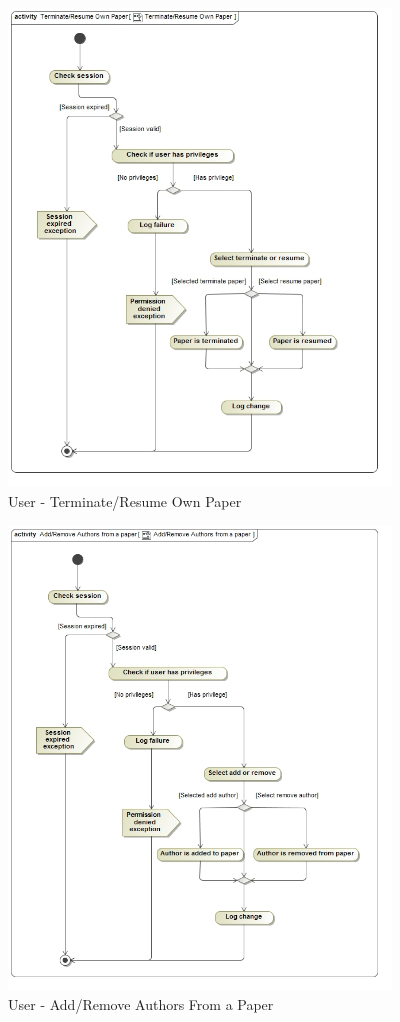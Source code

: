 \documentclass{article}
\begin{document}
			\begin{figure}[H]
					\includegraphics[width=4in, center]{../Diagrams/Process Specifications/Publication subsystem/Terminate_Resume Own Paper.jpg}
					\caption{User - Terminate/Resume Own Paper}
			\end{figure}
			\begin{figure}[H]
				\includegraphics[width=4in, center]{../Diagrams/Process Specifications/Publication subsystem/Add_Remove Authors from a paper.jpg}
				\caption{User - Add/Remove Authors From a Paper}
			\end{figure}
\end{document}

